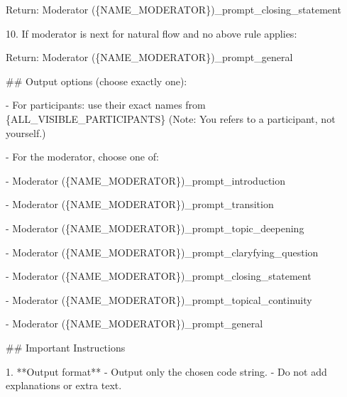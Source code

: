 \documentclass[
  letterpaper,
  DIV=11,
  numbers=noendperiod]{scrartcl}
\newenvironment{Shaded}{\begin{snugshade}}{\end{snugshade}}
\newcommand{\NormalTok}[1]{\textcolor[rgb]{0.00,0.23,0.31}{#1}}
\newcommand{\SpecialCharTok}[1]{\textcolor[rgb]{0.37,0.37,0.37}{#1}}
\newcommand{\SpecialStringTok}[1]{\textcolor[rgb]{0.13,0.47,0.30}{#1}}
\begin{document}
\begin{Shaded}
\begin{Highlighting}[]
\SpecialStringTok{    Return: \textasciigrave{}Moderator (}\SpecialCharTok{\{}\NormalTok{NAME\_MODERATOR}\SpecialCharTok{\}}\SpecialStringTok{)\_prompt\_closing\_statement\textasciigrave{}}

\SpecialStringTok{10. If moderator is next for natural flow and no above rule applies:}

\SpecialStringTok{    Return: \textasciigrave{}Moderator (}\SpecialCharTok{\{}\NormalTok{NAME\_MODERATOR}\SpecialCharTok{\}}\SpecialStringTok{)\_prompt\_general\textasciigrave{}}


\SpecialStringTok{\#\# Output options (choose exactly one):}

\SpecialStringTok{{-} For participants: use their exact names from }\SpecialCharTok{\{}\NormalTok{ALL\_VISIBLE\_PARTICIPANTS}\SpecialCharTok{\}}\SpecialStringTok{ (Note: \textquotesingle{}You\textquotesingle{} refers to a participant, not yourself.)}

\SpecialStringTok{{-} For the moderator, choose one of:}

\SpecialStringTok{  {-} Moderator (}\SpecialCharTok{\{}\NormalTok{NAME\_MODERATOR}\SpecialCharTok{\}}\SpecialStringTok{)\_prompt\_introduction}

\SpecialStringTok{  {-} Moderator (}\SpecialCharTok{\{}\NormalTok{NAME\_MODERATOR}\SpecialCharTok{\}}\SpecialStringTok{)\_prompt\_transition}

\SpecialStringTok{  {-} Moderator (}\SpecialCharTok{\{}\NormalTok{NAME\_MODERATOR}\SpecialCharTok{\}}\SpecialStringTok{)\_prompt\_topic\_deepening}

\SpecialStringTok{  {-} Moderator (}\SpecialCharTok{\{}\NormalTok{NAME\_MODERATOR}\SpecialCharTok{\}}\SpecialStringTok{)\_prompt\_claryfying\_question}

\SpecialStringTok{  {-} Moderator (}\SpecialCharTok{\{}\NormalTok{NAME\_MODERATOR}\SpecialCharTok{\}}\SpecialStringTok{)\_prompt\_closing\_statement}

\SpecialStringTok{  {-} Moderator (}\SpecialCharTok{\{}\NormalTok{NAME\_MODERATOR}\SpecialCharTok{\}}\SpecialStringTok{)\_prompt\_topical\_continuity}

\SpecialStringTok{  {-} Moderator (}\SpecialCharTok{\{}\NormalTok{NAME\_MODERATOR}\SpecialCharTok{\}}\SpecialStringTok{)\_prompt\_general}


\SpecialStringTok{\#\# Important Instructions}

\SpecialStringTok{1. **Output format**  }
\SpecialStringTok{   {-} Output only the chosen code string.  }
\SpecialStringTok{   {-} Do not add explanations or extra text.  }


\end{Highlighting}
\end{Shaded}
\end{document}

